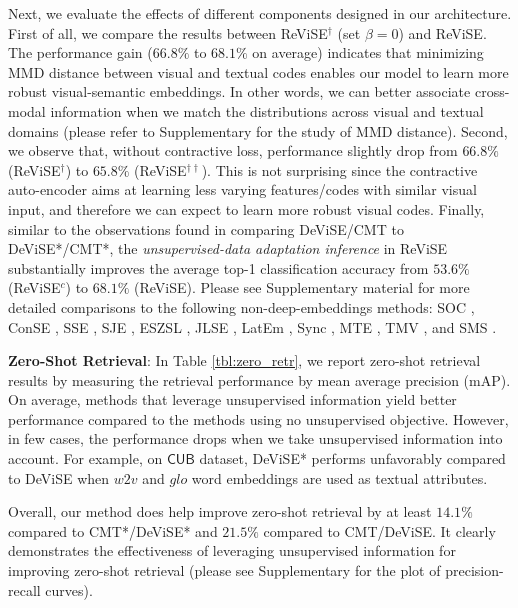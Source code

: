 {{Next, we evaluate the effects of different components designed in our architecture. First of all, we compare the results between ReViSE$^\dagger$ (set $\beta = 0$) and ReViSE. The performance gain ($66.8\%$ to $68.1\%$ on average) indicates that minimizing MMD distance between visual and textual codes enables our model to learn more robust visual-semantic embeddings. In other words, we can better associate cross-modal information when we match the distributions across visual and textual domains (please refer to Supplementary for the study of MMD distance). Second, we observe that, without contractive loss, performance slightly drop from $66.8\%$ (ReViSE$^\dagger$) to $65.8\%$ (ReViSE$^{\dagger\dagger}$). This is not surprising since the contractive auto-encoder aims at learning less varying features/codes with similar visual input, and therefore we can expect to learn more robust visual codes. 
Finally, similar to the observations found in comparing DeViSE/CMT to DeViSE*/CMT*, the {\em unsupervised-data adaptation inference} in ReViSE substantially improves the average top-1 classification 
accuracy from $53.6\%$ (ReViSE$^c$) to $68.1\%$ (ReViSE).
Please see Supplementary material for more detailed comparisons to the following non-deep-embeddings methods: SOC \cite{palatucci2009zero}, ConSE \cite{norouzi2013zero}, SSE \cite{zhang2015zero}, SJE \cite{akata2015evaluation}, ESZSL \cite{romera2015embarrassingly}, JLSE \cite{zhang2016zero1}, LatEm \cite{xian2016latent}, Sync \cite{changpinyo2016synthesized}, MTE \cite{bucher2016improving}, TMV \cite{fu2015transductive}, and SMS \cite{guo2016transductive}.




\vspace{0.1in}
\hspace{-5mm} {\bf Zero-Shot Retrieval}:
In Table \ref{tbl:zero_retr}, we report zero-shot retrieval results by measuring the retrieval performance by mean average precision (mAP). On average, methods that leverage unsupervised information yield better performance compared to the methods using no unsupervised objective. However, in few cases, the performance drops when we take unsupervised information into account. For example, on $\mathsf{CUB}$ dataset, DeViSE* performs unfavorably compared to DeViSE when $\textit{w2v}$ and $\textit{glo}$ word embeddings are used as textual attributes. 

Overall, our method does help improve zero-shot retrieval by at least $14.1\%$ compared to CMT*/DeViSE* and $21.5\%$ compared to CMT/DeViSE. It clearly demonstrates the effectiveness of leveraging unsupervised information for improving zero-shot retrieval (please see Supplementary for the plot of precision-recall curves).

}}
